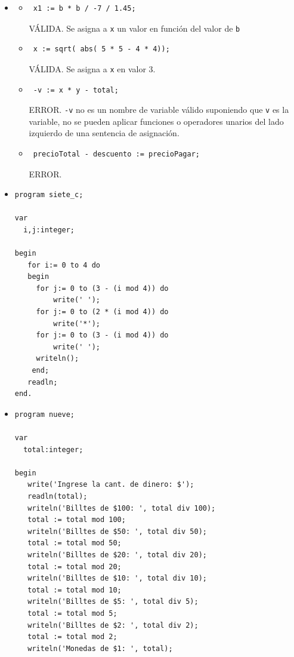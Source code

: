 \documentclass[a4paper,10pt]{article}
\begin{document}
\begin{itemize}
\item[5]
    \begin{itemize}
        \item[a-] \begin{verbatim} x1 := b * b / -7 / 1.45;\end{verbatim} V\'ALIDA. Se asigna a \verb=x= un valor en funci\'on del valor de \verb=b=
        \item[b-] \begin{verbatim} x := sqrt( abs( 5 * 5 - 4 * 4));\end{verbatim} V\'ALIDA. Se asigna a \verb=x= en valor 3.
        \item[c-] \begin{verbatim} -v := x * y - total;\end{verbatim} ERROR. \verb=-v= no es un nombre de variable v\'alido suponiendo que \verb=v= es la variable, no se pueden aplicar funciones o operadores unarios del lado izquierdo de una sentencia de asignaci\'on.
        \item[d-] \begin{verbatim} precioTotal - descuento := precioPagar;\end{verbatim} ERROR. 
    \end{itemize}	

\item[7.c-]
\begin{small}
\begin{verbatim}
program siete_c;

var
  i,j:integer;

begin
   for i:= 0 to 4 do
   begin
     for j:= 0 to (3 - (i mod 4)) do
         write(' ');
     for j:= 0 to (2 * (i mod 4)) do
         write('*');
     for j:= 0 to (3 - (i mod 4)) do
         write(' ');
     writeln();
    end;
   readln;
end.
\end{verbatim}
\end{small}

\item[9]
\begin{small}
\begin{verbatim}
program nueve;

var
  total:integer;

begin
   write('Ingrese la cant. de dinero: $');
   readln(total);
   writeln('Billtes de $100: ', total div 100);
   total := total mod 100;
   writeln('Billtes de $50: ', total div 50);
   total := total mod 50;
   writeln('Billtes de $20: ', total div 20);
   total := total mod 20;
   writeln('Billtes de $10: ', total div 10);
   total := total mod 10;
   writeln('Billtes de $5: ', total div 5);
   total := total mod 5;
   writeln('Billtes de $2: ', total div 2);
   total := total mod 2;
   writeln('Monedas de $1: ', total);


\end{verbatim}
\end{small}
\end{itemize}
\end{document}
